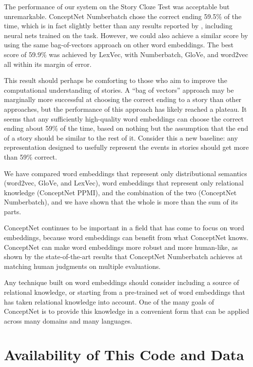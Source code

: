 \documentclass[letterpaper]{article}
\begin{document}
The performance of our system on the Story Cloze Test was acceptable but
unremarkable.  ConceptNet Numberbatch chose the correct ending 59.5\% of the
time, which is in fact slightly better than any results reported by
\citeauthor{mostafazadeh2016cloze} , including
neural nets trained on the task. However, we could also achieve a similar score
by using the same bag-of-vectors approach on other word embeddings. The best
score of 59.9\% was achieved by LexVec, with Numberbatch, GloVe, and word2vec
all within its margin of error.

This result should perhaps be comforting to those who aim to improve the
computational understanding of stories.  A ``bag of vectors'' approach  may be
marginally more successful at choosing the correct ending to a story than other
approaches, but the performance of this approach has likely reached a plateau.
It seems that any sufficiently high-quality word embeddings can choose the
correct ending about 59\% of the time, based on nothing but the assumption that
the end of a story should be similar to the rest of it. Consider this a new
baseline: any representation designed to usefully represent the
events in stories should get more than 59\% correct.

We have compared word embeddings that represent only distributional semantics
(word2vec, GloVe, and LexVec), word embeddings that represent only relational
knowledge (ConceptNet PPMI), and the combination of the two (ConceptNet
Numberbatch), and we have shown that the whole is more than the sum of its
parts.

ConceptNet continues to be important in a field that has come to focus on word
embeddings, because word embeddings can benefit from what ConceptNet knows.
ConceptNet can make word embeddings more robust and more human-like, as shown
by the state-of-the-art results that ConceptNet Numberbatch achieves at
matching human judgments on multiple evaluations.

Any technique built on word embeddings should
consider including a source of relational knowledge, or starting from a
pre-trained set of word embeddings that has taken relational knowledge into
account. One of the many goals of ConceptNet is to provide this knowledge in a
convenient form that can be applied across many domains and many languages.

\section{Availability of This Code and Data}
\end{document}
